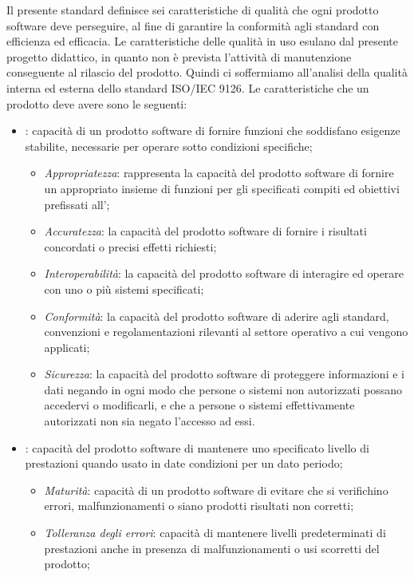 Il presente standard definisce sei caratteristiche di qualità che ogni prodotto software deve perseguire, al fine di garantire la conformità agli standard con efficienza ed efficacia. Le caratteristiche delle qualità in uso esulano dal presente progetto didattico, in quanto non è prevista l'attività di manutenzione conseguente al rilascio del prodotto. Quindi ci soffermiamo all'analisi della qualità interna ed esterna dello standard ISO/IEC 9126.
Le caratteristiche che un prodotto deve avere sono le seguenti:

\begin{itemize}
\item {}: capacità di un prodotto software di fornire funzioni che soddisfano esigenze stabilite, necessarie per operare sotto condizioni specifiche;
\begin{itemize}
\item \emph{Appropriatezza}: rappresenta la capacità del prodotto software di fornire un appropriato insieme di funzioni per gli specificati compiti ed obiettivi prefissati all';
\item \emph{Accuratezza}: la capacità del prodotto software di fornire i risultati concordati o precisi effetti richiesti;
\item \emph{Interoperabilità}: la capacità del prodotto software di interagire ed operare con uno o più sistemi specificati;
\item \emph{Conformità}: la capacità del prodotto software di aderire agli standard, convenzioni e regolamentazioni rilevanti al settore operativo a cui vengono applicati;
\item \emph{Sicurezza}: la capacità del prodotto software di proteggere informazioni e i dati negando in ogni modo che persone o sistemi non autorizzati possano accedervi o modificarli, e che a persone o sistemi effettivamente autorizzati non sia negato l'accesso ad essi.
\end{itemize}
\item {}: capacità del prodotto software di mantenere uno specificato livello di prestazioni quando usato in date condizioni per un dato periodo;
\begin{itemize}
\item \emph{Maturità}: capacità di un prodotto software di evitare che si verifichino errori, malfunzionamenti o siano prodotti risultati non corretti;
\item \emph{Tolleranza degli errori}: capacità di mantenere livelli predeterminati di prestazioni anche in presenza di malfunzionamenti o usi scorretti del prodotto;

\end{itemize}
\end{itemize}
